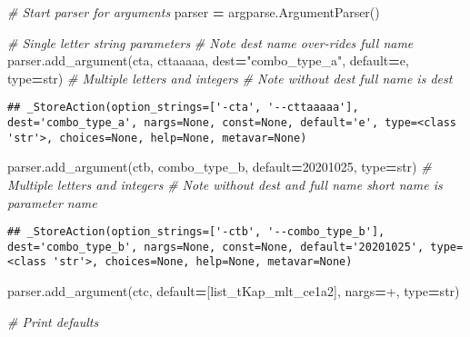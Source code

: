 \documentclass[
]{book}
\newenvironment{Shaded}{\begin{snugshade}}{\end{snugshade}}
\newcommand{\BuiltInTok}[1]{#1}
\newcommand{\CommentTok}[1]{\textcolor[rgb]{0.56,0.35,0.01}{\textit{#1}}}
\newcommand{\NormalTok}[1]{#1}
\newcommand{\OperatorTok}[1]{\textcolor[rgb]{0.81,0.36,0.00}{\textbf{#1}}}
\newcommand{\StringTok}[1]{\textcolor[rgb]{0.31,0.60,0.02}{#1}}
\begin{document}
\begin{Shaded}
\begin{Highlighting}[]
\CommentTok{\# Start parser for arguments}
\NormalTok{parser }\OperatorTok{=}\NormalTok{ argparse.ArgumentParser()}

\CommentTok{\# Single letter string parameters}
\CommentTok{\# Note dest name over{-}rides full name}
\NormalTok{parser.add\_argument(}\StringTok{\textquotesingle{}{-}cta\textquotesingle{}}\NormalTok{, }\StringTok{\textquotesingle{}{-}{-}cttaaaaa\textquotesingle{}}\NormalTok{, dest}\OperatorTok{=}\StringTok{"combo\_type\_a"}\NormalTok{, default}\OperatorTok{=}\StringTok{\textquotesingle{}e\textquotesingle{}}\NormalTok{,}
                    \BuiltInTok{type}\OperatorTok{=}\BuiltInTok{str}\NormalTok{)}
\CommentTok{\# Multiple letters and integers}
\CommentTok{\# Note without dest full name is dest}
\end{Highlighting}
\end{Shaded}

\begin{verbatim}
## _StoreAction(option_strings=['-cta', '--cttaaaaa'], dest='combo_type_a', nargs=None, const=None, default='e', type=<class 'str'>, choices=None, help=None, metavar=None)
\end{verbatim}

\begin{Shaded}
\begin{Highlighting}[]
\NormalTok{parser.add\_argument(}\StringTok{\textquotesingle{}{-}ctb\textquotesingle{}}\NormalTok{, }\StringTok{\textquotesingle{}{-}{-}combo\_type\_b\textquotesingle{}}\NormalTok{, default}\OperatorTok{=}\StringTok{\textquotesingle{}20201025\textquotesingle{}}\NormalTok{,}
                    \BuiltInTok{type}\OperatorTok{=}\BuiltInTok{str}\NormalTok{)}
\CommentTok{\# Multiple letters and integers}
\CommentTok{\# Note without dest and full name short name is parameter name}
\end{Highlighting}
\end{Shaded}

\begin{verbatim}
## _StoreAction(option_strings=['-ctb', '--combo_type_b'], dest='combo_type_b', nargs=None, const=None, default='20201025', type=<class 'str'>, choices=None, help=None, metavar=None)
\end{verbatim}

\begin{Shaded}
\begin{Highlighting}[]
\NormalTok{parser.add\_argument(}\StringTok{\textquotesingle{}{-}ctc\textquotesingle{}}\NormalTok{, default}\OperatorTok{=}\NormalTok{[}\StringTok{\textquotesingle{}list\_tKap\_mlt\_ce1a2\textquotesingle{}}\NormalTok{],}
\NormalTok{                    nargs}\OperatorTok{=}\StringTok{\textquotesingle{}+\textquotesingle{}}\NormalTok{, }\BuiltInTok{type}\OperatorTok{=}\BuiltInTok{str}\NormalTok{)}

\CommentTok{\# Print defaults}
\end{Highlighting}
\end{Shaded}
\end{document}

